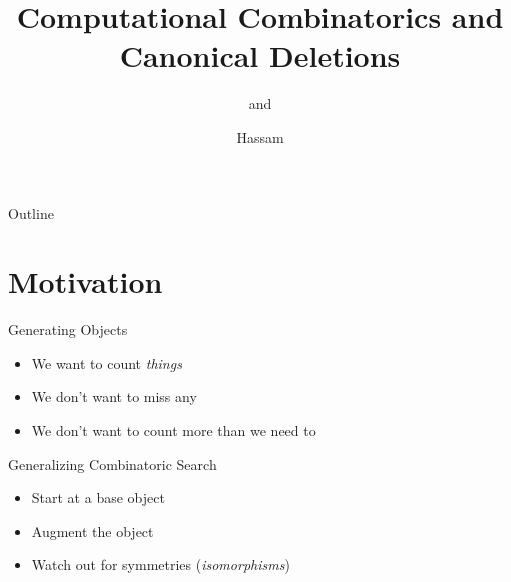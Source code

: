 \documentclass[aspectratio=169]{beamer}
\title{Computational Combinatorics and Canonical Deletions}
\subtitle{\cite[Stolee]{CanonicalDeletions} and \cite[Stolee]{SmallGraphs}}
\author{Hassam}
\date{}
\begin{document}

\begin{frame}
\titlepage
\end{frame}

\begin{frame}{Outline}
  \tableofcontents
\end{frame}

\section{Motivation}
\frame{\sectionpage}
\begin{frame}{Generating Objects}
    \begin{itemize}
        \item We want to count \textcolor{sigma@mainblue}{\emph{things}} \pause
        \item We don't want to miss any \pause
        \item We don't want to count more than we need to
    \end{itemize}
\end{frame}

\begin{frame}{Generalizing Combinatoric Search}
\begin{itemize}
    \item Start at a base object \pause
    \item Augment the object \pause
    \item Watch out for symmetries (\textcolor{sigma@mainblue}{\emph{isomorphisms}})
\end{itemize}
\end{frame}
\end{document}
